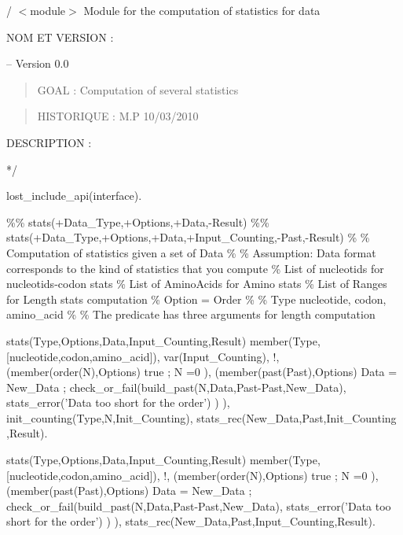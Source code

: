 


/\Spow{} $<$module$>$ Module for the computation of statistics for data

NOM ET VERSION :

 -- Version 0.0

\begin{quote}
GOAL :
Computation of several statistics
\end{quote}

\begin{quote}
HISTORIQUE :
M.P 10/03/2010
\end{quote}

DESCRIPTION :

*/

\Sneck{} lost_include_api(interface).

\%\% stats(+Data_Type,+Options,+Data,-Result)
\%\% stats(+Data_Type,+Options,+Data,+Input_Counting,-Past,-Result)
\%
\% Computation of statistics given a set of Data
\%
\% Assumption: Data format corresponds to the kind of statistics that you compute
\% List of nucleotids for nucleotids-codon stats
\% List of AminoAcids for Amino stats
\% List of Ranges for Length stats computation
\% Option = Order
\%
\% Type nucleotide, codon, amino_acid
\%
\% The predicate has three arguments for length computation

\begin{center}
stats(Type,Options,Data,Input_Counting,Result) \Sneck{}
member(Type,[nucleotide,codon,amino_acid]),
var(Input_Counting),
!,
(member(order(N),Options) \Sifthen{}
true
;
N =0
),
(member(past(Past),Options) \Sifthen{}
Data = New_Data
;
check_or_fail(build_past(N,Data,Past-Past,New_Data),
stats_error('Data too short for the order')
)
),
init_counting(Type,N,Init_Counting),
stats_rec(New_Data,Past,Init_Counting ,Result).
\end{center}

\begin{center}
stats(Type,Options,Data,Input_Counting,Result) \Sneck{}
member(Type,[nucleotide,codon,amino_acid]),
!,
(member(order(N),Options) \Sifthen{}
true
;
N =0
),
(member(past(Past),Options) \Sifthen{}
Data = New_Data
;
check_or_fail(build_past(N,Data,Past-Past,New_Data),
stats_error('Data too short for the order')
)
),
stats_rec(New_Data,Past,Input_Counting,Result).
\end{center}

